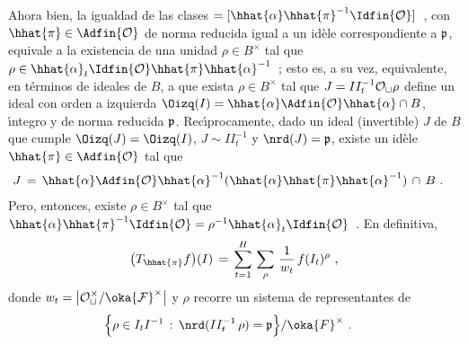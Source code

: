 Ahora bien, la igualdad de las clases
\begin{math}
	[\hhat{\alpha}_{t}\Idfin{\cal{O}}]=
		[\hhat{\alpha}\hhat{\pi}^{-1}\Idfin{\cal{O}}]
\end{math}~,
con $\hhat{\pi}\in\Adfin{\cal{O}}$ de norma reducida igual a un id\`{e}le
correspondiente a $\frak{p}$, equivale a la existencia de una unidad
$\rho\in B^{\times}$ tal que
\begin{math}
	\rho\in\hhat{\alpha}_{t}\Idfin{\cal{O}}\hhat{\pi}\hhat{\alpha}^{-1}
\end{math}~;
esto es, a su vez, equivalente, en t\'{e}rminos de ideales de $B$, a que exista
$\rho\in B^{\times}$ tal que $J=II_{t}^{-1}\cal{O}_{t}\rho$ define un ideal con
orden a izquierda $\Oizq(I)=\hhat{\alpha}\Adfin{\cal{O}}\hhat{\alpha}\cap B$,
\'{\i}ntegro y de norma reducida $\frak{p}$. Rec\'{\i}procamente, dado un ideal
(invertible) $J$ de $B$ que cumple $\Oizq(J)=\Oizq(I)$, $J\sim II_{t}^{-1}$ y
$\nrd(J)=\frak{p}$, existe un id\`{e}le $\hhat{\pi}\in\Adfin{\cal{O}}$ tal que
\begin{align*}
	J & \,=\,\hhat{\alpha}\Adfin{\cal{O}}\hhat{\alpha}^{-1}
		(\hhat{\alpha}\hhat{\pi}\hhat{\alpha}^{-1})\,\cap\,B
	\text{ .}
\end{align*}
%
Pero, entonces, existe $\rho\in B^{\times}$ tal que
\begin{math}
	\hhat{\alpha}\hhat{\pi}^{-1}\Idfin{\cal{O}}=
		\rho^{-1}\hhat{\alpha}_{t}\Idfin{\cal{O}}
\end{math}~.
En definitiva,
\begin{equation}
	\label{eq:heckeparadefinidosconideales}
	\big(T_{\hhat{\pi}}f\big)(I) \,=\,\sum_{t=1}^{H}\,\sum_{\rho}\,
		\frac{1}{w_{t}}\,f(I_{t})^{\rho}
	\text{ ,}
\end{equation}
%
donde $w_{t}=\big|\cal{O}_{t}^{\times}/\oka{F}^{\times}\big|$ y $\rho$
recorre un sistema de representantes de
\begin{align*}
	& \Big\{ \rho\in I_{t}I^{-1}\,:\,\nrd(II_{t}^{-1}\,\rho)=\frak{p}\Big\}
		/\oka{F}^{\times}
	\text{ .}
\end{align*}
%

